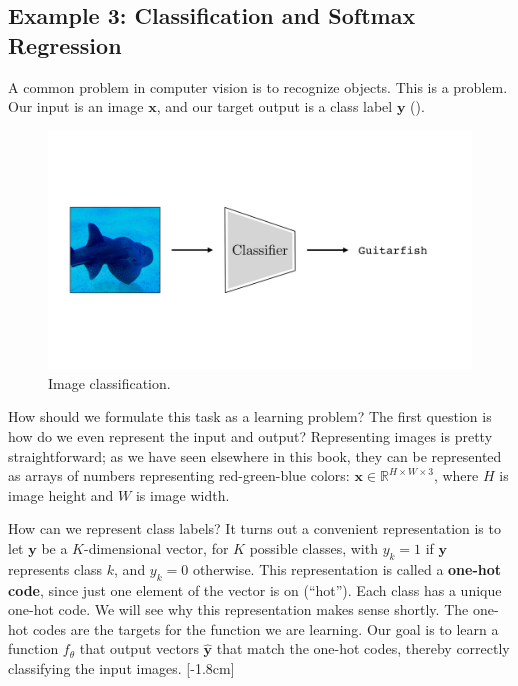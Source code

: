 \subsection{Example 3: Classification and Softmax Regression}\label{sec:intro_to_learning:image_classification}

A common problem in computer vision is to recognize objects. This is a  problem. Our input is an image $\mathbf{x}$, and our target output is a class label $\mathbf{y}$ (\fig{\ref{fig:intro_to_learning:image_classification}}).

\begin{figure}[h]
    \centerline{
        \includegraphics[width=0.7\linewidth]{./figures/intro_to_learning/image_classification.pdf}
    }
    \caption{Image classification.}
    \label{fig:intro_to_learning:image_classification}
\end{figure}

How should we formulate this task as a learning problem? The first question is how do we even represent the input and output? Representing images is pretty straightforward; as we have seen elsewhere in this book, they can be represented as arrays of numbers representing red-green-blue colors: $\mathbf{x} \in \mathbb{R}^{H \times W \times 3}$, where $H$ is image height and $W$ is image width.

How can we represent class labels? It turns out a convenient representation is to let $\mathbf{y}$ be a $K$-dimensional vector, for $K$ possible classes, with $y_k = 1$ if $\mathbf{y}$ represents class $k$, and $y_k = 0$ otherwise. This representation is called a \textbf{one-hot code}, since just one element of the vector is on (``hot''). Each class has a unique one-hot code. We will see why this representation makes sense shortly. The one-hot codes are the targets for the function we are learning. Our goal is to learn a function $f_{\theta}$ that output vectors $\hat{\mathbf{y}}$ that match the one-hot codes, thereby correctly classifying the input images.
[-1.8cm]

